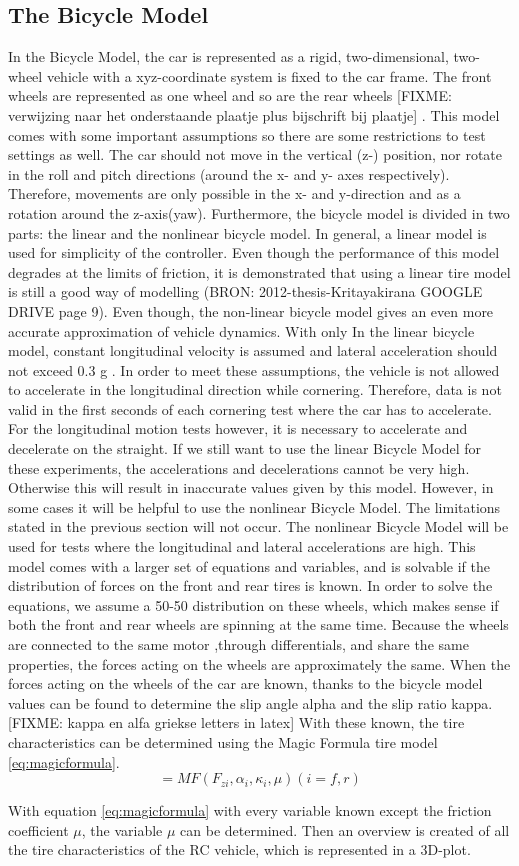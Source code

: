 \subsection{The Bicycle Model}
In the Bicycle Model, the car is represented as a rigid, two-dimensional, two-wheel vehicle with a xyz-coordinate system is fixed to the car frame. The front wheels are represented as one wheel and so are the rear wheels [FIXME: verwijzing naar het onderstaande plaatje plus bijschrift bij plaatje] . This model comes with some important assumptions so there are some restrictions to test settings as well. The car should not move in the vertical (z-) position, nor rotate in the roll and pitch directions (around the x- and y- axes respectively). Therefore, movements are only possible in the x- and y-direction and as a rotation around the z-axis(yaw). 
Furthermore, the bicycle model is divided in two parts: the linear and the nonlinear bicycle model. In general, a linear model is used for simplicity of the controller. Even though the performance of this model degrades at the limits of friction, it is demonstrated that using a linear tire model is still a good way of modelling (BRON: 2012-thesis-Kritayakirana GOOGLE DRIVE page 9). Even though, the non-linear bicycle model gives an even more accurate approximation of vehicle dynamics. With only 
In the linear bicycle model, constant longitudinal velocity is assumed and lateral acceleration should not exceed 0.3 g . In order to meet these assumptions, the vehicle is not allowed to accelerate in the longitudinal direction while cornering. Therefore, data is not valid in the first seconds of each cornering test where the car has to accelerate. For the longitudinal motion tests however, it is necessary to accelerate and decelerate on the straight. If we still want to use the linear Bicycle Model for these experiments, the accelerations and decelerations cannot be very high. Otherwise this will result in inaccurate values given by this model.
	However, in some cases it will be helpful to use the nonlinear Bicycle Model. The limitations stated in the previous section will not occur. The nonlinear Bicycle Model will be used for tests where the longitudinal and lateral accelerations are high. This model comes with a larger set of equations and variables, and is solvable if the distribution of forces on the front and rear tires is known. In order to solve the equations, we assume a 50-50 distribution on these wheels, which makes sense if both the front and rear wheels are spinning at the same time. Because the wheels are connected to the same motor ,through differentials, and share the same properties, the forces acting on the wheels are approximately the same. 
When the forces acting on the wheels of the car are known, thanks to the bicycle model values can be found to determine the slip angle alpha and the slip ratio kappa.  [FIXME: kappa en alfa griekse letters in latex] With these known, the tire characteristics can be determined using the Magic Formula tire model
 \ref{eq:magicformula}. 
\begin{equation}
	[F_{xwi} ,F_{ywi}] = MF(F_{zi},\alpha_{i},\kappa_{i},\mu) (i = f,r)
	\label{eq:magicformula} 
\end{equation}


With equation \ref{eq:magicformula} with every variable known except the friction coefficient \(\mu\), the variable \(\mu\) can be determined. Then an overview is created of all the tire characteristics of the RC vehicle, which is represented in a 3D-plot.
